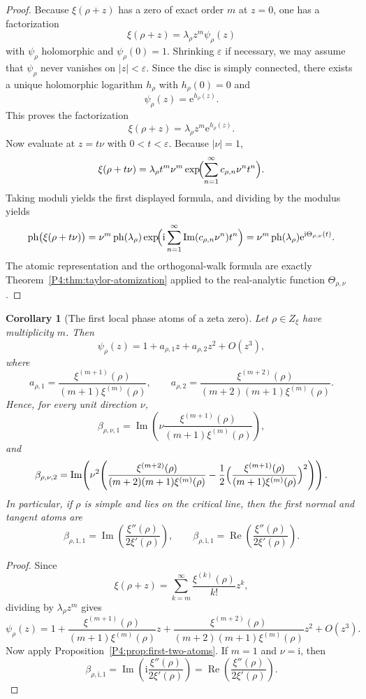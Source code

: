 \documentclass[11pt,a4paper]{article}
\numberwithin{equation}{section}
\newtheorem{corollary}[theorem]{Corollary}
\theoremstyle{definition}
\theoremstyle{remark}
\DeclareMathOperator{\Rea}{Re}
\DeclareMathOperator{\Ima}{Im}
\newcommand{\ph}{\operatorname{ph}}
\newcommand{\e}{\mathrm e}
\newcommand{\ii}{\mathrm i}
\begin{document}
\begin{proof}
Because $\xi(\rho+z)$ has a zero of exact order $m$ at $z=0$, one has a factorization
\[
\xi(\rho+z)=\lambda_\rho z^m \psi_\rho(z)
\]
with $\psi_\rho$ holomorphic and $\psi_\rho(0)=1$.  Shrinking $\varepsilon$ if necessary, we may assume that $\psi_\rho$ never vanishes on $|z|<\varepsilon$.  Since the disc is simply connected, there exists a unique holomorphic logarithm $h_\rho$ with $h_\rho(0)=0$ and
\[
\psi_\rho(z)=\e^{h_\rho(z)}.
\]
This proves the factorization
\[
\xi(\rho+z)=\lambda_\rho z^m \e^{h_\rho(z)}.
\]
Now evaluate at $z=t\nu$ with $0<t<\varepsilon$.  Because $|\nu|=1$,
\[
\xi(\rho+t\nu)=\lambda_\rho t^m \nu^m \exp\!\Bigl(\sum_{n=1}^{\infty} c_{\rho,n}\nu^n t^n\Bigr).
\]
Taking moduli yields the first displayed formula, and dividing by the modulus yields
\[
\ph\bigl(\xi(\rho+t\nu)\bigr)=\nu^m\ph(\lambda_\rho)\exp\!\Bigl(\ii\sum_{n=1}^{\infty}\Ima(c_{\rho,n}\nu^n)t^n\Bigr)
=\nu^m\ph(\lambda_\rho)\e^{\ii\Theta_{\rho,\nu}(t)}.
\]
The atomic representation and the orthogonal-walk formula are exactly Theorem~\ref{P4:thm:taylor-atomization} applied to the real-analytic function $\Theta_{\rho,\nu}$.
\end{proof}

\begin{corollary}[The first local phase atoms of a zeta zero]\label{P4:cor:zeta-first-atoms}
Let $\rho\in Z_\xi$ have multiplicity $m$.  Then
\[
\psi_\rho(z)=1+a_{\rho,1} z+a_{\rho,2} z^2+O(z^3),
\]
where
\[
a_{\rho,1}=\frac{\xi^{(m+1)}(\rho)}{(m+1)\xi^{(m)}(\rho)},
\qquad
a_{\rho,2}=\frac{\xi^{(m+2)}(\rho)}{(m+2)(m+1)\xi^{(m)}(\rho)}.
\]
Hence, for every unit direction $\nu$,
\[
\beta_{\rho,\nu,1}=\Ima\!\left(\nu\frac{\xi^{(m+1)}(\rho)}{(m+1)\xi^{(m)}(\rho)}\right),
\]
and
\[
\beta_{\rho,\nu,2}=\Ima\!\left(\nu^2\Biggl(\frac{\xi^{(m+2)}(\rho)}{(m+2)(m+1)\xi^{(m)}(\rho)}-
\frac12\Bigl(\frac{\xi^{(m+1)}(\rho)}{(m+1)\xi^{(m)}(\rho)}\Bigr)^2\Biggr)\right).
\]
In particular, if $\rho$ is simple and lies on the critical line, then the first normal and tangent atoms are
\[
\beta_{\rho,1,1}=\Ima\!\left(\frac{\xi''(\rho)}{2\xi'(\rho)}\right),
\qquad
\beta_{\rho,\ii,1}=\Rea\!\left(\frac{\xi''(\rho)}{2\xi'(\rho)}\right).
\]
\end{corollary}

\begin{proof}
Since
\[
\xi(\rho+z)=\sum_{k=m}^{\infty}\frac{\xi^{(k)}(\rho)}{k!}z^k,
\]
dividing by $\lambda_\rho z^m$ gives
\[
\psi_\rho(z)=1+
\frac{\xi^{(m+1)}(\rho)}{(m+1)\xi^{(m)}(\rho)}z+
\frac{\xi^{(m+2)}(\rho)}{(m+2)(m+1)\xi^{(m)}(\rho)}z^2+O(z^3).
\]
Now apply Proposition~\ref{P4:prop:first-two-atoms}.  If $m=1$ and $\nu=\ii$, then
\[
\beta_{\rho,\ii,1}=\Ima\!\left(\ii\frac{\xi''(\rho)}{2\xi'(\rho)}\right)=\Rea\!\left(\frac{\xi''(\rho)}{2\xi'(\rho)}\right).
\]
\end{proof}
\end{document}
